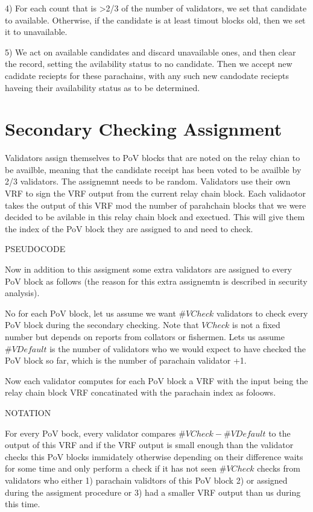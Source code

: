 4) For each count that is >2/3 of the number of validators, we set that candidate to available. Otherwise, if the candidate is at least timout blocks old, then we set it to unavailable.

5) We act on available candidates and discard unavailable ones, and then clear the record, setting the avilability status to no candidate. Then we accept new cadidate reciepts for these parachains, with any such new candodate reciepts haveing their availability status as to be determined.


\section{Secondary Checking Assignment}\label{shot-assignment}

Validators assign themselves to PoV blocks that are noted on the relay chian to be availble, meaning that the candidate receipt has been voted to be availble by 2/3 validators. 
The assignemnt needs to be random. Validators use their own VRF to sign the VRF output from the current relay chain block. Each validaotor takes the output of this VRF mod the number of parahchain blocks that we were decided to be avilable in this relay chain block and exectued. This will give them the index of the PoV block they are assigned to and need to check. 

PSEUDOCODE

Now in addition to this assigment some extra validators are assigned to every PoV block as follows (the reason for this extra assignemtn is described in security analysis).

No for each PoV block, let us assume we want $\#VCheck$ validators to check every PoV block during the secondary checking. Note that $VCheck$ is not a fixed number but depends on reports from collators or fishermen. Lets us assume $\#VDefault$ is the number  of validators who we would expect to have checked the PoV block so far, which is the number of parachain validator +1.  

Now each validator computes for each PoV block a VRF with the input being the relay chain block VRF concatinated with the parachain index as foloows. 

NOTATION

For every PoV bock, every validator compares $\#VCheck - \#VDefault$ to the output of this VRF and if the VRF output is small enough than the validator checks this PoV blocks immidately otherwise depending on their difference waits for some time and only perform a check if it has not seen $\#VCheck$ checks from validators who either 1) parachain validtors of this PoV block 2) or assigned during the assigment procedure or 3) had a smaller VRF output than us during this time.


